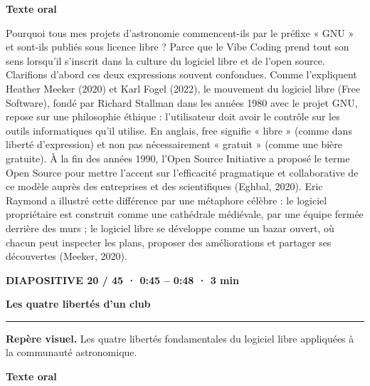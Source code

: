 \documentclass[10pt,letterpaper]{article}
\newcommand{\repere}[1]{\textcolor{accent}{\bfseries #1}\par}
\begin{document}
\par\medskip\repere{Texte oral}

Pourquoi tous mes projets d'astronomie commencent-ils par le préfixe « GNU » et sont-ils publiés sous licence libre ? Parce que le Vibe Coding prend tout son sens lorsqu'il s'inscrit dans la culture du logiciel libre et de l'open source. Clarifions d'abord ces deux expressions souvent confondues. Comme l'expliquent Heather Meeker (2020) et Karl Fogel (2022), le mouvement du logiciel libre (Free Software), fondé par Richard Stallman dans les années 1980 avec le projet GNU, repose sur une philosophie éthique : l'utilisateur doit avoir le contrôle sur les outils informatiques qu'il utilise. En anglais, free signifie « libre » (comme dans liberté d'expression) et non pas nécessairement « gratuit » (comme une bière gratuite). À la fin des années 1990, l'Open Source Initiative a proposé le terme Open Source pour mettre l'accent sur l'efficacité pragmatique et collaborative de ce modèle auprès des entreprises et des scientifiques (Eghbal, 2020). Eric Raymond a illustré cette différence par une métaphore célèbre : le logiciel propriétaire est construit comme une cathédrale médiévale, par une équipe fermée derrière des murs ; le logiciel libre se développe comme un bazar ouvert, où chacun peut inspecter les plans, proposer des améliorations et partager ses découvertes (Meeker, 2020).\par

\clearpage\repere{DIAPOSITIVE 20 / 45 · 0:45 – 0:48 · 3 min}

{\Large\bfseries Les quatre libertés d'un club\par}

\smallskip\hrule\smallskip

{\small\textbf{Repère visuel.} Les quatre libertés fondamentales du logiciel libre appliquées à la communauté astronomique.\par}

\par\medskip\repere{Texte oral}
\end{document}
